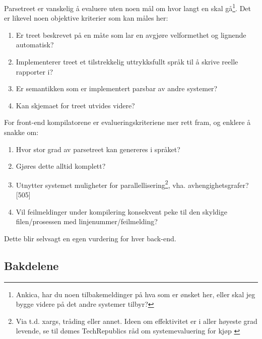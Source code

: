 Parsetreet er vanskelig å evaluere uten noen mål om hvor langt en skal gå\footnote{Ankica, har du noen tilbakemeldinger på hva som er ønsket her, eller skal jeg bygge videre på det andre systemer tilbyr?}.
Det er likevel noen objektive kriterier som kan måles her:
\begin{enumerate}
\item Er treet beskrevet på en måte som lar en avgjøre velformethet og lignende automatisk?
\item Implementerer treet et tilstrekkelig uttrykksfullt språk til å skrive reelle rapporter i?
\item Er semantikken som er implementert parsbar av andre systemer?
\item Kan skjemaet for treet utvides videre?
\end{enumerate}

For front-end kompilatorene er evalueringskriteriene mer rett fram, og enklere å snakke om:
\begin{enumerate}
\item Hvor stor grad av parsetreet kan genereres i språket?
\item Gjøres dette alltid komplett?
\item Utnytter systemet muligheter for parallellisering\footnote{Via t.d. xargs, tråding eller annet. Ideen om effektivitet er i aller høyeste grad levende, se til dømes TechRepublics råd om systemevaluering for kjøp \cite{TechRepublic-SupportabilityChecklist}}, vha. avhengighetsgrafer?\cite{Fowler2010}[505]
\item Vil feilmeldinger under kompilering konsekvent peke til den skyldige filen/prosessen med linjenummer/feilmelding?
\end{enumerate}

Dette blir selvsagt en egen vurdering for hver back-end.
\subsection{Bakdelene}
\label{subsec:evaluering-bakdelene}

